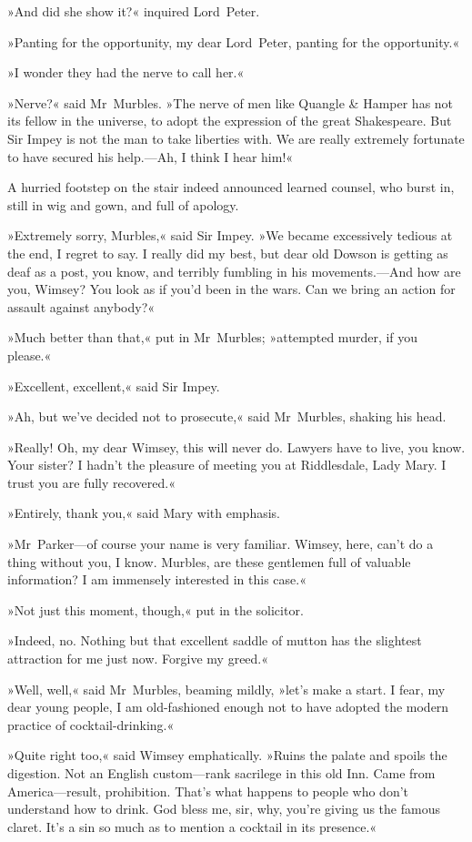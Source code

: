 »And did she show it?« inquired Lord~Peter.

»Panting for the opportunity, my dear Lord~Peter, panting for the opportunity.«

»I wonder they had the nerve to call her.«

»Nerve?« said Mr~Murbles. »The nerve of men like Quangle \& Hamper has not its fellow in the universe, to adopt the expression of the great Shakespeare. But Sir Impey is not the man to take liberties with. We are really extremely fortunate to have secured his help.—Ah, I think I hear him!«

A hurried footstep on the stair indeed announced learned counsel, who burst in, still in wig and gown, and full of apology.

»Extremely sorry, Murbles,« said Sir Impey. »We became excessively tedious at the end, I regret to say. I really did my best, but dear old Dowson is getting as deaf as a post, you know, and terribly fumbling in his movements.—And how are you, Wimsey? You look as if you'd been in the wars. Can we bring an action for assault against anybody?«

»Much better than that,« put in Mr~Murbles; »attempted murder, if you please.«

»Excellent, excellent,« said Sir Impey.

»Ah, but we've decided not to prosecute,« said Mr~Murbles, shaking his head.

»Really! Oh, my dear Wimsey, this will never do. Lawyers have to live, you know. Your sister? I hadn't the pleasure of meeting you at Riddlesdale, Lady Mary. I trust you are fully recovered.«

»Entirely, thank you,« said Mary with emphasis.

»Mr~Parker—of course your name is very familiar. Wimsey, here, can't do a thing without you, I know. Murbles, are these gentlemen full of valuable information? I am immensely interested in this case.«

»Not just this moment, though,« put in the solicitor.

»Indeed, no. Nothing but that excellent saddle of mutton has the slightest attraction for me just now. Forgive my greed.«

»Well, well,« said Mr~Murbles, beaming mildly, »let's make a start.  I fear, my dear young people, I am old-fashioned enough not to have adopted the modern practice of cocktail-drinking.«

»Quite right too,« said Wimsey emphatically. »Ruins the palate and spoils the digestion. Not an English custom—rank sacrilege in this old Inn. Came from America—result, prohibition. That's what happens to people who don't understand how to drink. God bless me, sir, why, you're giving us the famous claret. It's a sin so much as to mention a cocktail in its presence.«

